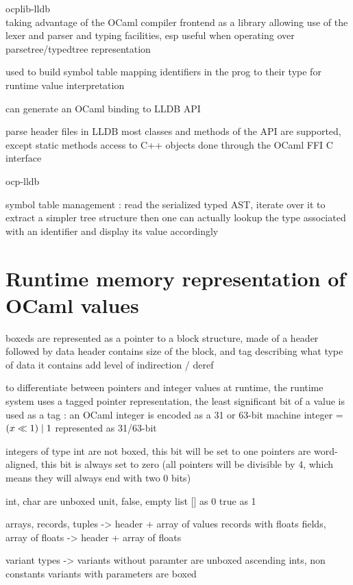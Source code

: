 ocplib-lldb \\

taking advantage of the OCaml compiler frontend as a library
allowing use of the lexer and parser and typing facilities, esp
useful when operating over parsetree/typedtree representation

used to build symbol table mapping identifiers in the prog to their type
for runtime value interpretation

can generate an OCaml binding to LLDB API

parse header files in LLDB
most classes and methods of the API are supported, except static methods
access to C++ objects done through the OCaml FFI C interface

ocp-lldb

symbol table management :
read the serialized typed AST, iterate over it to extract a simpler tree
structure
then one can actually lookup the type associated with an identifier and display
its value accordingly

\section{Runtime memory representation of OCaml values}

\Glspl{boxed} are represented as a pointer to a block structure, made of a
header followed by data
header contains size of the block, and tag describing what type of data it
contains
add level of indirection / deref

to differentiate between pointers and integer values at runtime, the runtime
system uses a tagged pointer representation, the least significant bit of a
value is used as a tag : an OCaml integer is encoded as a 31 or 63-bit machine integer = $ (x \ll 1) \mathrel{|} 1 $
represented as 31/63-bit

integers of type int are not boxed, this bit will be set to one
pointers are word-aligned, this bit is always set to zero
(all pointers will be divisible by 4, which means they will always end with two
0 bits)

int, char are unboxed
unit, false, empty list [] as 0
true as 1

arrays, records, tuples -> header + array of values
records with floats fields, array of floats -> header + array of floats

variant types -> variants without paramter are unboxed ascending ints, non
constants variants with parameters are boxed
